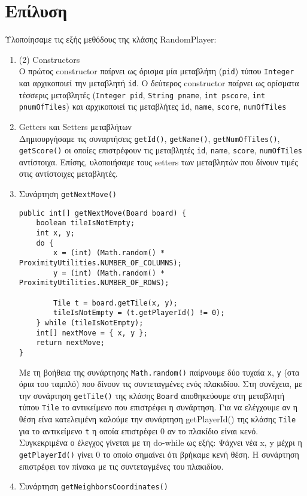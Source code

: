 \chapter{Επίλυση}
Υλοποίησαμε τις εξής μεθόδους της κλάσης RandomPlayer:
\begin{enumerate}
\item (2) Constructors\\
O πρώτος constructor παίρνει ως όρισμα μία μεταβλήτη (\lstinline!pid!) τύπου \lstinline!Integer!
και αρχικοποιεί την μεταβλητή \lstinline!id!.
Ο δεύτερος constructor παίρνει ως
ορίσματα τέσσερις μεταβλητές
(\lstinline!Integer pid!,
\lstinline!String pname!,
\lstinline!int pscore!,
\lstinline!int pnumOfTiles!)
και αρχικοποιεί τις μεταβλήτες \lstinline!id!, \lstinline!name!, \lstinline!score!, \lstinline!numOfTiles!
\item Getters και Setters μεταβλήτων\\
Δημιουργήσαμε τις συναρτήσεις \lstinline!getId()!, \lstinline!getName()!, \lstinline!getNumOfTiles()!,
\lstinline!getScore()! οι οποίες επιστρέφουν τις μεταβλητές \lstinline!id!, \lstinline!name!, \lstinline!score!,
\lstinline!numOfTiles! αντίστοιχα.
Επίσης, υλοποιήσαμε τους setters των μεταβλητών που δίνουν τιμές στις αντίστοιχες μεταβλητές.
\item Συνάρτηση \lstinline!getNextMove()!

\begin{lstlisting}[caption={Η συνάρτηση \lstinline!getNextMove()!}, breaklines=true, numbers=none]
public int[] getNextMove(Board board) {
	boolean tileIsNotEmpty;
	int x, y;
	do {
		x = (int) (Math.random() * ProximityUtilities.NUMBER_OF_COLUMNS);
		y = (int) (Math.random() * ProximityUtilities.NUMBER_OF_ROWS);

		Tile t = board.getTile(x, y);
		tileIsNotEmpty = (t.getPlayerId() != 0);
	} while (tileIsNotEmpty);
	int[] nextMove = { x, y };
	return nextMove;
}
\end{lstlisting}

Με τη βοήθεια της συνάρτησης \lstinline!Math.random()! παίρνουμε δύο τυχαία \lstinline!x!, \lstinline!y!
(στα όρια του ταμπλό) που δίνουν τις συντεταγμένες ενός πλακιδίου.
Στη συνέχεια, με την συνάρτηση \lstinline!getTile()!
της κλάσης \lstinline!Board!
αποθηκεύουμε στη μεταβλητή τύπου \lstinline!Tile!
το αντικείμενο που επιστρέφει η συνάρτηση.
Για να ελέγχουμε αν η θέση είνα κατελειμένη καλούμε την συνάρτηση getPlayerId() της
κλάσης \lstinline!Tile! για το αντικείμενο \lstinline!t! η οποία επιστρέφει $0$ αν το πλακίδιο είναι
κενό.
Συγκεκριμένα ο έλεγχος γίνεται με τη do-while ως εξής:
Ψάχνει νέα x, y μέχρι η \lstinline!getPlayerId()! γίνει $0$ το οποίο σημαίνει ότι βρήκαμε
κενή θέση.
Η συνάρτηση επιστρέφει τον πίνακα με τις συντεταγμένες του πλακιδίου.
\item Συνάρτηση \lstinline!getNeighborsCoordinates()!


\end{enumerate}
